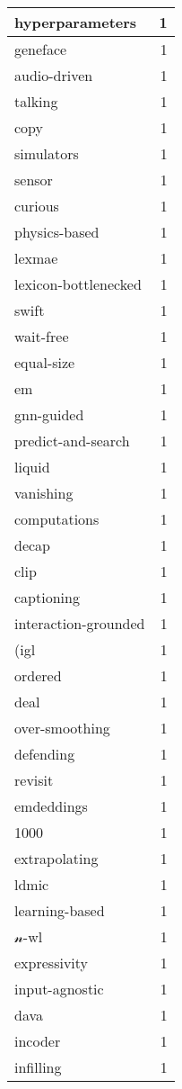 \begin{table}[h]
\begin{tabular}{|l|r|}
\hline
hyperparameters & 1 \\
\hline
geneface & 1 \\
\hline
audio-driven & 1 \\
\hline
talking & 1 \\
\hline
copy & 1 \\
\hline
simulators & 1 \\
\hline
sensor & 1 \\
\hline
curious & 1 \\
\hline
physics-based & 1 \\
\hline
lexmae & 1 \\
\hline
lexicon-bottlenecked & 1 \\
\hline
swift & 1 \\
\hline
wait-free & 1 \\
\hline
equal-size & 1 \\
\hline
em & 1 \\
\hline
gnn-guided & 1 \\
\hline
predict-and-search & 1 \\
\hline
liquid & 1 \\
\hline
vanishing & 1 \\
\hline
computations & 1 \\
\hline
decap & 1 \\
\hline
clip & 1 \\
\hline
captioning & 1 \\
\hline
interaction-grounded & 1 \\
\hline
(igl & 1 \\
\hline
ordered & 1 \\
\hline
deal & 1 \\
\hline
over-smoothing & 1 \\
\hline
defending & 1 \\
\hline
revisit & 1 \\
\hline
emdeddings & 1 \\
\hline
1000 & 1 \\
\hline
extrapolating & 1 \\
\hline
ldmic & 1 \\
\hline
learning-based & 1 \\
\hline
$\mathscr{n}$-wl & 1 \\
\hline
expressivity & 1 \\
\hline
input-agnostic & 1 \\
\hline
dava & 1 \\
\hline
incoder & 1 \\
\hline
infilling & 1 \\

\end{tabular}
\end{table}
